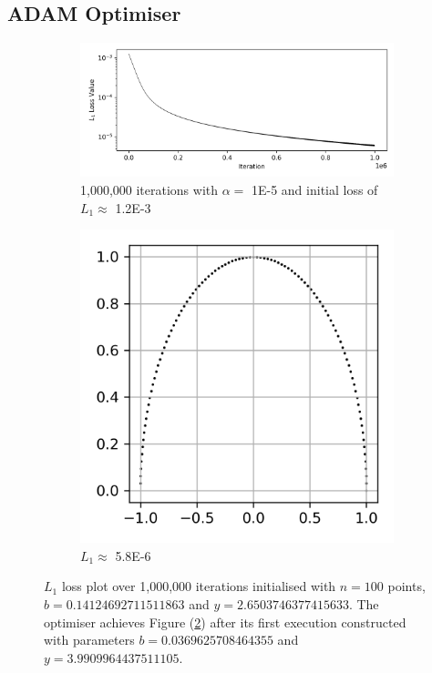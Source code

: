 \documentclass[a4paper]{report}
\begin{document}
\subsection{ADAM Optimiser}
\begin{figure}[H]
    \begin{subfigure}{.7\linewidth}
      \includegraphics[width=\linewidth]{images/gd/ADAM_loss.png}
      \caption{1,000,000 iterations with $\alpha =$ 1E-5 and initial loss of $L_1 \approx$ 1.2E-3 }
    \end{subfigure}\hfill
    \begin{subfigure}{.3\linewidth}
      \includegraphics[width=\linewidth]{images/gd/params_after_first_ADAM.png}
      \caption{$L_1 \approx$ 5.8E-6}
      \label{fig:first_adam}
    \end{subfigure}
    
    \caption{$L_1$ loss plot over 1,000,000 iterations initialised with $n = 100$ points, $b = 0.14124692711511863 $ and $y = 2.6503746377415633$. The optimiser achieves Figure (\ref{fig:first_adam}) after its first execution constructed with parameters $b = 0.0369625708464355$ and $y = 3.9909964437511105$. }
\end{figure}
\end{document}
